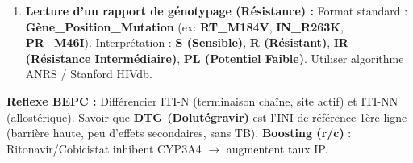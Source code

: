 \documentclass[11pt]{article}
\begin{document}
\begin{methode}
\begin{enumerate}
\begin{itemize}
        \item \textbf{Barrière génétique haute :} Plusieurs mutations nécessaires (INI : DTG ; IP boostés : DRV/r).
    \end{itemize}
    \item \textbf{Lecture d'un rapport de génotypage (Résistance) :} Format standard : \textbf{Gène\_Position\_Mutation} (ex: \textbf{RT\_M184V}, \textbf{IN\_R263K}, \textbf{PR\_M46I}). Interprétation : \textbf{S (Sensible)}, \textbf{R (Résistant)}, \textbf{IR (Résistance Intermédiaire)}, \textbf{PL (Potentiel Faible)}. Utiliser algorithme ANRS / Stanford HIVdb.
\end{enumerate}
\textbf{Reflexe BEPC :} Différencier ITI-N (terminaison chaîne, site actif) et ITI-NN (allostérique). Savoir que \textbf{DTG (Dolutégravir)} est l'INI de référence 1ère ligne (barrière haute, peu d'effets secondaires, sans TB). \textbf{Boosting (r/c)} : Ritonavir/Cobicistat inhibent CYP3A4 $\rightarrow$ augmentent taux IP.
\end{methode}
\end{document}
